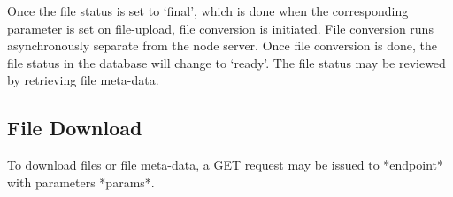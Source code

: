 Once the file status is set to `final', which is done when the corresponding parameter is set on file-upload, file conversion is initiated. File conversion runs asynchronously separate from the node server. Once file conversion is done, the file status in the database will change to `ready'. The file status may be reviewed by retrieving file meta-data. 

\subsection{File Download}

To download files or file meta-data, a GET request may be issued to *endpoint* with parameters *params*. 
